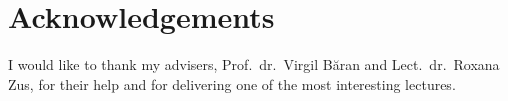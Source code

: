 \documentclass[12pt, twoside]{report}
\begin{document}


\clearpage
\begingroup
  \pagestyle{empty}
  \null
  \newpage
\endgroup

\tableofcontents
\clearpage

\chapter*{Acknowledgements}
\thispagestyle{empty}

I would like to thank my advisers, Prof.~dr.~Virgil Băran and Lect.~dr.~Roxana Zus,
for their help and for delivering one of the most interesting lectures.

\clearpage








\printbibliography
\end{document}
